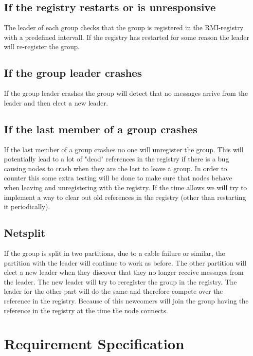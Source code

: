 \documentclass[english]{article}
\begin{document}
\subsection{If the registry restarts or is unresponsive}
The leader of each group checks that the group is registered in the RMI-registry with a predefined intervall. If the registry has restarted for some reason the leader will re-register the group.

\subsection{If the group leader crashes}
If the group leader crashes the group will detect that no messages arrive from the leader and then elect a new leader.

\subsection{If the last member of a group crashes}
If the last member of a group crashes no one will unregister the group.
This will potentially lead to a lot of "dead" references in the registry if there is a bug causing nodes to crash when they are the last to leave a group. In order to counter this some extra testing will be done to make sure that nodes behave when leaving and unregistering with the registry.
If the time allows we will try to implement a way to clear out old references in the registry (other than restarting it periodically).

\subsection{Netsplit}
If the group is split in two partitions, due to a cable failure or similar, the partition with the leader will continue to work as before. The other partition will elect a new leader when they discover that they no longer receive messages from the leader.
The new leader will try to reregister the group in the registry. The leader for the other part will do the same and therefore compete over the reference in the registry. Because of this newcomers will join the group having the reference in the registry at the time the node connects.

\section{Requirement Specification}
\end{document}
